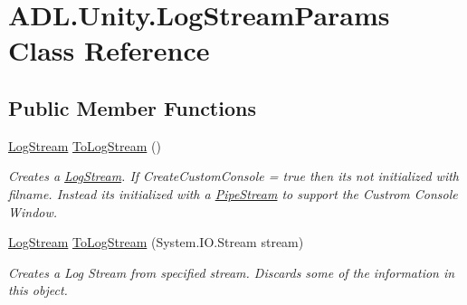\hypertarget{class_a_d_l_1_1_unity_1_1_log_stream_params}{}\section{A\+D\+L.\+Unity.\+Log\+Stream\+Params Class Reference}
\label{class_a_d_l_1_1_unity_1_1_log_stream_params}
\subsection*{Public Member Functions}
\begin{DoxyCompactItemize}
\item 
\mbox{\hyperlink{class_a_d_l_1_1_log_stream}{Log\+Stream}} \mbox{\hyperlink{class_a_d_l_1_1_unity_1_1_log_stream_params_a511976146d776a6e618baf1e47c99f34}{To\+Log\+Stream}} ()
\begin{DoxyCompactList}\small\item\em Creates a \mbox{\hyperlink{class_a_d_l_1_1_log_stream}{Log\+Stream}}. If Create\+Custom\+Console = true then its not initialized with filname. Instead its initialized with a \mbox{\hyperlink{class_a_d_l_1_1_pipe_stream}{Pipe\+Stream}} to support the Custrom Console Window. \end{DoxyCompactList}\item 
\mbox{\hyperlink{class_a_d_l_1_1_log_stream}{Log\+Stream}} \mbox{\hyperlink{class_a_d_l_1_1_unity_1_1_log_stream_params_a8cd3548465c20596918ee37292bed704}{To\+Log\+Stream}} (System.\+I\+O.\+Stream stream)
\begin{DoxyCompactList}\small\item\em Creates a Log Stream from specified stream. Discards some of the information in this object. \end{DoxyCompactList}\end{DoxyCompactItemize}
